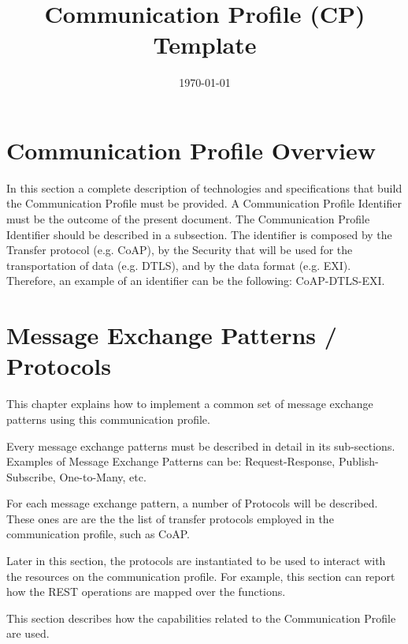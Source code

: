 \documentclass{article}
\date{\today} & 1.2 \\
\title{Communication Profile (CP) Template}
\begin{document}
\maketitle
\tableofcontents
\newpage

\section[Communication Profile Overview]{Communication Profile Overview}
In this section a complete description of technologies and specifications that build the Communication Profile must be provided. A Communication Profile Identifier must be the outcome of the present document. The Communication Profile Identifier should be described in a subsection. The identifier is composed by the Transfer protocol (e.g. CoAP), by the Security that will be used for the transportation of data (e.g. DTLS), and by the data format (e.g. EXI). Therefore, an example of an identifier can be the following: CoAP-DTLS-EXI.


\section[Message Exchange Patterns / Protocols]{Message Exchange Patterns / Protocols}
This chapter explains how to implement a common set of message exchange patterns using this communication profile.

Every message exchange patterns must be described in detail in its sub-sections. Examples of Message Exchange Patterns can be: Request-Response, Publish-Subscribe, One-to-Many, etc.

For each message exchange pattern, a number of Protocols will be described. These ones are are the the list of transfer protocols employed in the communication profile, such as CoAP.

Later in this section, the protocols are instantiated to be used to interact with the resources on the communication profile. For example, this section can report how the REST operations are mapped over the functions.

This section describes how the capabilities related to the Communication Profile are used.
\end{document}
